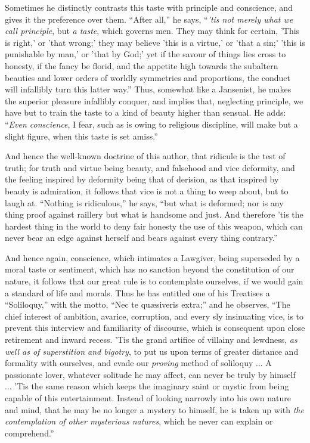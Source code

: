 Sometimes he distinctly contrasts this taste with principle and
conscience, and gives it the preference over them. ``After
all,'' he says, ``\emph{'tis not merely what we call principle},
but \emph{a taste}, which governs men. They may think for certain,
'This is right,' or 'that wrong;' they may believe 'this is a virtue,'
or 'that a sin;' 'this is punishable by man,' or 'that by God;' yet if
the savour of things lies cross to honesty, if the fancy be florid,
and the appetite high towards the subaltern beauties and lower orders
of worldly symmetries and proportions, the conduct will infallibly
turn this latter way.'' Thus, somewhat like a Jansenist, he makes
the superior pleasure infallibly conquer, and implies that, neglecting
principle, we have but to train the taste to a kind of beauty higher
than sensual. He adds: ``\emph{Even conscience}, I fear, such as
is owing to religious discipline, will make but a slight figure, when
this taste is set amiss.''

And hence the well-known doctrine of this author, that ridicule is
the test of truth; for truth and virtue being beauty, and falsehood
and vice deformity, and the feeling inspired by deformity being that
of derision, as that inspired by beauty is admiration, it follows that
vice is not a thing to weep about, but to laugh at. ``Nothing is
ridiculous,'' he says, ``but what is deformed; nor is any
thing proof against raillery but what is handsome and just. And
therefore 'tis the hardest thing in the world to deny fair honesty the
use of this weapon, which can never bear an edge against herself and
bears against every thing contrary.''

And hence again, conscience, which intimates a Lawgiver, being
superseded by a moral taste or sentiment, which has no sanction
beyond the constitution of our nature, it follows that our great rule
is to contemplate ourselves, if we would gain a standard of life and
morals. Thus he has entitled one of his Treatises a
``Soliloquy,'' with the motto, ``Nec te quæsiveris
extra;'' and he observes, ``The chief interest of ambition,
avarice, corruption, and every sly insinuating vice, is to prevent
this interview and familiarity of discourse, which is consequent upon
close retirement and inward recess. 'Tis the grand artifice of
villainy and lewdness, \emph{as well as of superstition and bigotry},
to put us upon terms of greater distance and formality with ourselves,
and evade our \emph{proving} method of soliloquy ... A passionate lover,
whatever solitude he may affect, can never be truly by himself ... 'Tis
the same reason which keeps the imaginary saint or mystic from being
capable of this entertainment. Instead of looking narrowly into his
own nature and mind, that he may be no longer a mystery to himself, he
is taken up with \emph{the contemplation of other mysterious natures},
which he never can explain or comprehend.''

